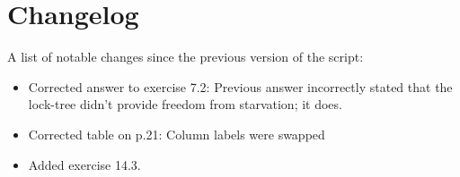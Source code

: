 \documentclass[main]{subfiles}
\begin{document}
\section{Changelog}
A list of notable changes since the previous version of the script:
\begin{itemize}
    \item Corrected answer to exercise 7.2: Previous answer incorrectly stated that the lock-tree didn't provide freedom from starvation; it does.
    \item Corrected table on p.21: Column labels were swapped
    \item Added exercise 14.3.
\end{itemize}
\end{document}
